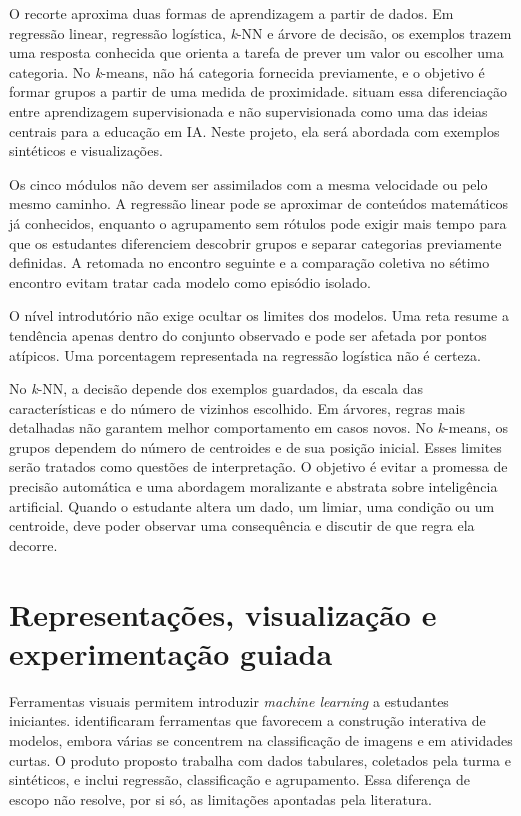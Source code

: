 O recorte aproxima duas formas de aprendizagem a partir de dados. Em regressão linear, regressão logística, \textit{k}-NN e árvore de decisão, os exemplos trazem uma resposta conhecida que orienta a tarefa de prever um valor ou escolher uma categoria. No \textit{k}-means, não há categoria fornecida previamente, e o objetivo é formar grupos a partir de uma medida de proximidade.  situam essa diferenciação entre aprendizagem supervisionada e não supervisionada como uma das ideias centrais para a educação em IA. Neste projeto, ela será abordada com exemplos sintéticos e visualizações.

Os cinco módulos não devem ser assimilados com a mesma velocidade ou pelo mesmo caminho. A regressão linear pode se aproximar de conteúdos matemáticos já conhecidos, enquanto o agrupamento sem rótulos pode exigir mais tempo para que os estudantes diferenciem descobrir grupos e separar categorias previamente definidas. A retomada no encontro seguinte e a comparação coletiva no sétimo encontro evitam tratar cada modelo como episódio isolado.

O nível introdutório não exige ocultar os limites dos modelos. Uma reta resume a tendência apenas dentro do conjunto observado e pode ser afetada por pontos atípicos. Uma porcentagem representada na regressão logística não é certeza.

No \textit{k}-NN, a decisão depende dos exemplos guardados, da escala das características e do número de vizinhos escolhido. Em árvores, regras mais detalhadas não garantem melhor comportamento em casos novos. No \textit{k}-means, os grupos dependem do número de centroides e de sua posição inicial. Esses limites serão tratados como questões de interpretação. O objetivo é evitar a promessa de precisão automática e uma abordagem moralizante e abstrata sobre inteligência artificial. Quando o estudante altera um dado, um limiar, uma condição ou um centroide, deve poder observar uma consequência e discutir de que regra ela decorre.

\section{Representações, visualização e experimentação guiada}

Ferramentas visuais permitem introduzir \textit{machine learning} a estudantes iniciantes.  identificaram ferramentas que favorecem a construção interativa de modelos, embora várias se concentrem na classificação de imagens e em atividades curtas. O produto proposto trabalha com dados tabulares, coletados pela turma e sintéticos, e inclui regressão, classificação e agrupamento. Essa diferença de escopo não resolve, por si só, as limitações apontadas pela literatura.

